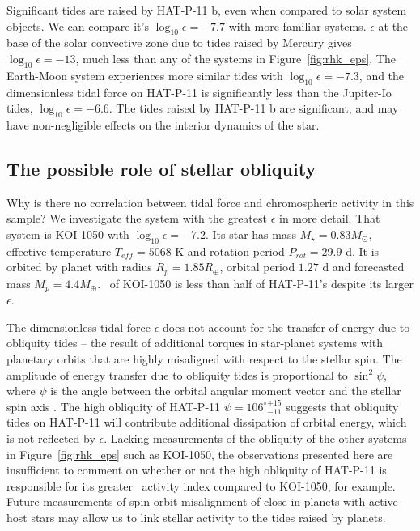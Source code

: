 Significant tides are raised by HAT-P-11 b, even when compared to solar system objects. We can compare it's $\log_{10}\epsilon = -7.7$ with more familiar systems. $\epsilon$ at the base of the solar convective zone due to tides raised by Mercury gives $\log_{10}\epsilon = -13$, much less than any of the systems in Figure~\ref{fig:rhk_eps}. The Earth-Moon system experiences more similar tides with $\log_{10}\epsilon = -7.3$, and the dimensionless tidal force on HAT-P-11 is significantly less than the Jupiter-Io tides, $\log_{10}\epsilon = -6.6$. The tides raised by HAT-P-11 b are significant, and may have non-negligible effects on the interior dynamics of the star.

\subsection{The possible role of stellar obliquity}

Why is there no correlation between tidal force and chromospheric activity in this sample? We investigate the system with the greatest $\epsilon$ in more detail. That system is KOI-1050 with $\log_{10}\epsilon=-7.2$. Its star has mass $M_\star = 0.83 M_\odot$, effective temperature $T_{eff}= 5068$ K and rotation period $P_{rot} = 29.9$ d. It is orbited by planet with radius $R_p = 1.85 R_\oplus$, orbital period $1.27$ d and forecasted mass $M_p = 4.4 M_\oplus$. \rprime\ of KOI-1050 is less than half of HAT-P-11's despite its larger $\epsilon$. 

The dimensionless tidal force $\epsilon$ does not account for the transfer of energy due to obliquity tides -- the result of additional torques in star-planet systems with planetary orbits that are highly misaligned with respect to the stellar spin. The amplitude of energy transfer due to obliquity tides is proportional to $\sin^2 \psi$, where $\psi$ is the angle between the orbital angular moment vector and the stellar spin axis \citep{Wisdom2004}. The high obliquity of HAT-P-11 $\psi = 106^\circ {}^{+15}_{-11}$ suggests that obliquity tides on HAT-P-11 will contribute additional dissipation of orbital energy, which is not reflected by $\epsilon$. Lacking measurements of the obliquity of the other systems in Figure~\ref{fig:rhk_eps} such as KOI-1050, the observations presented here are insufficient to comment on whether or not the high obliquity of HAT-P-11 is responsible for its greater \rprime\ activity index compared to KOI-1050, for example. Future measurements of spin-orbit misalignment of close-in planets with active host stars may allow us to link stellar activity to the tides raised by planets.

